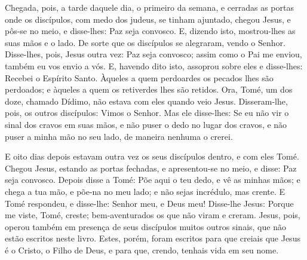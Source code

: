 Chegada, pois, a tarde daquele dia, o primeiro da semana, e
cerradas as portas onde os discípulos, com medo dos judeus, se
tinham ajuntado, chegou Jesus, e pôs-se no meio, e disse-lhes: Paz
seja convosco. E, dizendo isto, mostrou-lhes as suas mãos e o
lado. De sorte que os discípulos se alegraram, vendo o Senhor.
Disse-lhes, pois, Jesus outra vez: Paz seja convosco; assim
como o Pai me enviou, também eu vos envio a vós. E, havendo
dito isto, assoprou sobre eles e disse-lhes: Recebei o Espírito
Santo. Àqueles a quem perdoardes os pecados lhes são
perdoados; e àqueles a quem os retiverdes lhes são retidos.
Ora, Tomé, um dos doze, chamado Dídimo, não estava com eles
quando veio Jesus. Disseram-lhe, pois, os outros discípulos:
Vimos o Senhor. Mas ele disse-lhes: Se eu não vir o sinal dos cravos
em suas mãos, e não puser o dedo no lugar dos cravos, e não puser a
minha mão no seu lado, de maneira nenhuma o crerei.

E oito dias depois estavam outra vez os seus discípulos dentro, e
com eles Tomé. Chegou Jesus, estando as portas fechadas, e
apresentou-se no meio, e disse: Paz seja convosco. Depois
disse a Tomé: Põe aqui o teu dedo, e vê as minhas mãos; e chega a
tua mão, e põe-na no meu lado; e não sejas incrédulo, mas crente.
E Tomé respondeu, e disse-lhe: Senhor meu, e Deus meu!
Disse-lhe Jesus: Porque me viste, Tomé, creste;
bem-aventurados os que não viram e creram. Jesus, pois,
operou também em presença de seus discípulos muitos outros sinais,
que não estão escritos neste livro. Estes, porém, foram
escritos para que creiais que Jesus é o Cristo, o Filho de Deus, e
para que, crendo, tenhais vida em seu nome.

\medskip

